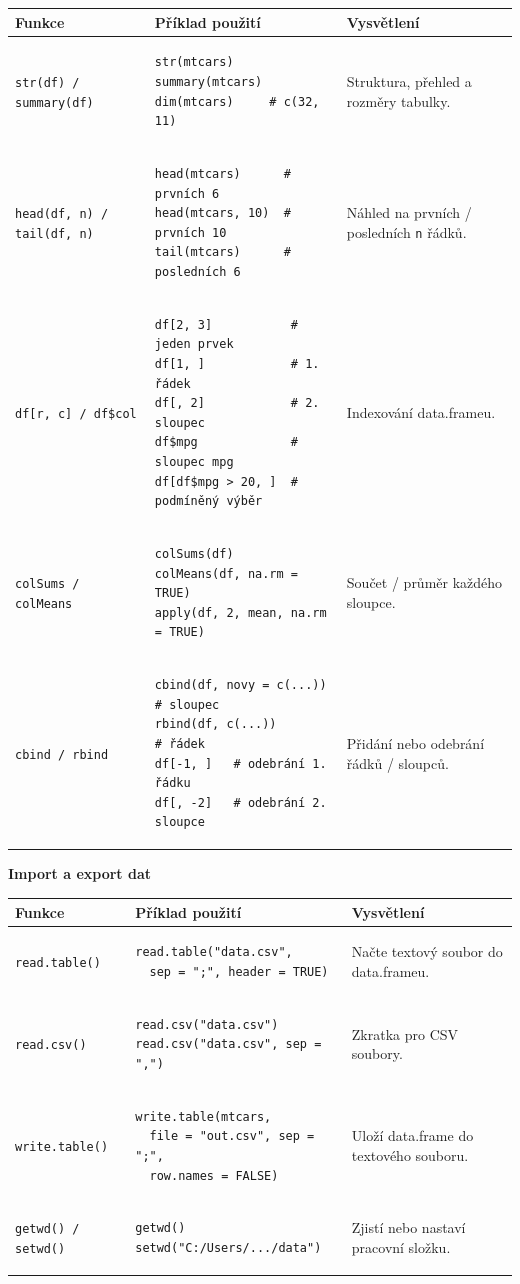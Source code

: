 \documentclass[a4paper, 11pt]{article}
\newenvironment{funkcedict}
{%
  \begingroup
  \renewcommand{\arraystretch}{1.4}%
  \lstset{basicstyle=\ttfamily\small, columns=fullflexible}%
  \setlength{\tabcolsep}{4pt}%
  \begin{tabular}{p{0.19\textwidth} p{0.38\textwidth} p{0.30\textwidth}}
  \textbf{Funkce} & \textbf{Příklad použití} & \textbf{Vysvětlení} \\
  \midrule
}
{%
  \end{tabular}%
  \endgroup
}
\begin{document}
			\begin{funkcedict}
				\texttt{str(df) / summary(df)} &
				\begin{lstlisting}
str(mtcars)
summary(mtcars)
dim(mtcars)     # c(32, 11)
				\end{lstlisting}
				& Struktura, přehled a rozměry tabulky. \\
				\texttt{head(df, n) / tail(df, n)} &
				\begin{lstlisting}
head(mtcars)      # prvních 6
head(mtcars, 10)  # prvních 10
tail(mtcars)      # posledních 6
				\end{lstlisting}
				& Náhled na prvních / posledních \texttt{n} řádků. \\
				\texttt{df[r, c] / df\$col} &
				\begin{lstlisting}
df[2, 3]           # jeden prvek
df[1, ]            # 1. řádek
df[, 2]            # 2. sloupec
df$mpg             # sloupec mpg
df[df$mpg > 20, ]  # podmíněný výběr
				\end{lstlisting}
				& Indexování data.frameu. \\
				\texttt{colSums / colMeans} &
				\begin{lstlisting}
colSums(df)
colMeans(df, na.rm = TRUE)
apply(df, 2, mean, na.rm = TRUE)
				\end{lstlisting}
				& Součet / průměr každého sloupce. \\
				\texttt{cbind / rbind} &
				\begin{lstlisting}
cbind(df, novy = c(...)) # sloupec
rbind(df, c(...))        # řádek
df[-1, ]   # odebrání 1. řádku
df[, -2]   # odebrání 2. sloupce
				\end{lstlisting}
				& Přidání nebo odebrání řádků / sloupců. \\
			\end{funkcedict}

			\medskip\noindent\textbf{Import a export dat}

			\begin{funkcedict}
				\texttt{read.table()} &
				\begin{lstlisting}
read.table("data.csv",
  sep = ";", header = TRUE)
				\end{lstlisting}
				& Načte textový soubor do data.frameu. \\
				\texttt{read.csv()} &
				\begin{lstlisting}
read.csv("data.csv")
read.csv("data.csv", sep = ",")
				\end{lstlisting}
				& Zkratka pro CSV soubory. \\
				\texttt{write.table()} &
				\begin{lstlisting}
write.table(mtcars,
  file = "out.csv", sep = ";",
  row.names = FALSE)
				\end{lstlisting}
				& Uloží data.frame do textového souboru. \\
				\texttt{getwd() / setwd()} &
				\begin{lstlisting}
getwd()
setwd("C:/Users/.../data")
				\end{lstlisting}
				& Zjistí nebo nastaví pracovní složku. \\
			\end{funkcedict}
\end{document}
